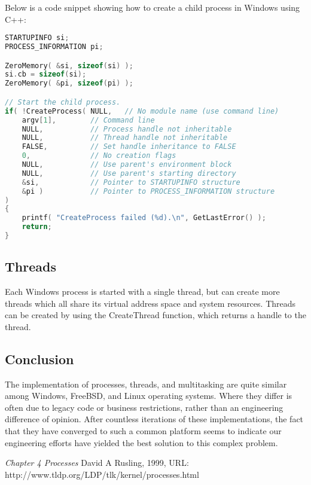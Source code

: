 \documentclass[letterpaper,draftclsnofoot,10pt,onecolumn,titlepage]{IEEEtran}\usepackage[margin=0.75in]{geometry}
\begin{document}
    Below is a code snippet showing how to create a child process in Windows using C++:
\begin{lstlisting}[language=C++]
STARTUPINFO si;
PROCESS_INFORMATION pi;

ZeroMemory( &si, sizeof(si) );
si.cb = sizeof(si);
ZeroMemory( &pi, sizeof(pi) );

// Start the child process.
if( !CreateProcess( NULL,   // No module name (use command line)
    argv[1],        // Command line
    NULL,           // Process handle not inheritable
    NULL,           // Thread handle not inheritable
    FALSE,          // Set handle inheritance to FALSE
    0,              // No creation flags
    NULL,           // Use parent's environment block
    NULL,           // Use parent's starting directory
    &si,            // Pointer to STARTUPINFO structure
    &pi )           // Pointer to PROCESS_INFORMATION structure
)
{
    printf( "CreateProcess failed (%d).\n", GetLastError() );
    return;
}
\end{lstlisting}

    \subsection{Threads}
    Each Windows process is started with a single thread, but can create more threads which all share its virtual
    address space and system resources. Threads can be created by using the CreateThread function, which returns a
    handle to the thread.
    
    
    \subsection{Conclusion}
    The implementation of processes, threads, and multitasking are quite similar among Windows, FreeBSD, and Linux 
    operating systems. Where they differ is often due to legacy code or business restrictions, rather than an 
    engineering difference of opinion. After countless iterations of these implementations, the fact that they 
    have converged to such a common platform seems to indicate our engineering efforts have yielded the best 
    solution to this complex problem.
    
    \begin{thebibliography}[1]
	    \textit{Chapter 4 Processes}
		David A Rusling, 1999, URL: http://www.tldp.org/LDP/tlk/kernel/processes.html
    \end{thebibliography}
\end{document}
